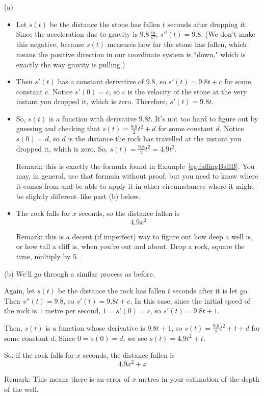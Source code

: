 \begin{solution}
(a)
\begin{itemize}
\item
Let $s(t)$ be the distance the stone has fallen $t$ seconds after dropping it. Since the acceleration due to gravity is $9.8~\frac{\mathrm{m}}{\mathrm{s}^2}$, $s''(t)=9.8$. (We don't make this negative, because $s(t)$ measures how far the stone has fallen, which means the positive direction in our coordinate system is ``down," which is exactly the way gravity is pulling.)
\item
 Then $s'(t)$ has a constant derivative of 9.8, so $s'(t)=9.8t+c$ for some constant
$c$. Notice $s'(0)=c$, so $c$ is the velocity of the stone at the very instant you dropped it, which is zero. Therefore, $s'(t)=9.8t$.
\item So, $s(t)$ is a function with derivative $9.8t$. It's not too hard to figure out by guessing and checking that $s(t)=\frac{9.8}{2}t^2+d$ for some constant $d$.
 Notice $s(0)=d$, so $d$ is the distance the rock has travelled at the instant you dropped it, which is zero. So, $s(t)=\frac{9.8}{2}t^2=4.9t^2$.

Remark: this is exactly the formula found in Example~\ref*{eg:fallingBallB}. You may, in general, use that formula without proof, but you need to know where it comes from and be able to apply it in other circumstances where it might be slightly different--like part (b) below.
\item
The rock falls for $x$ seconds, so the distance fallen is
\[4.9x^2 \]

Remark: this is a decent (if imperfect) way to figure out how deep a well is, or how tall a cliff is, when you're out and about. Drop a rock, square the time, multiply by 5.
\end{itemize}
\medskip
(b)
We'll go through a similar process as before.

Again, let $s(t)$ be the distance the rock has fallen $t$ seconds after it is let go. Then $s''(t)=9.8$, so $s'(t)=9.8t+c$. In this case, since the initial speed of the rock is $1$ metre per second, $1=s'(0)=c$, so $s'(t)=9.8t+1$.

Then, $s(t)$ is a function whose derivative is $9.8t+1$, so
$s(t)=\frac{9.8}{2}t^2+t+d$ for some constant $d$. Since $0=s(0)=d$, we see
$s(t)=4.9t^2+t$.

So, if the rock falls for $x$ seconds, the distance fallen is
\[4.9x^2+x\]

Remark: This means there is an error of $x$ metres in your estimation of the depth of the well.
\end{solution}




